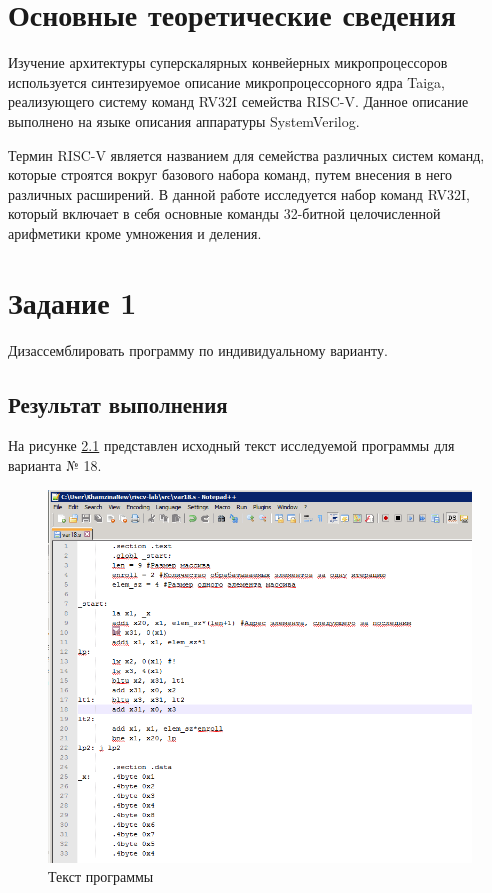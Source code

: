 \chapter{Основные теоретические сведения}

Изучение архитектуры суперскалярных конвейерных микропроцессоров используется синтезируемое описание микропроцессорного ядра Taiga, реализующего систему команд RV32I семейства RISC-V. Данное описание выполнено на языке описания аппаратуры SystemVerilog.

Термин RISC-V является названием для семейства различных систем команд, которые строятся вокруг базового набора команд, путем внесения в него различных расширений. В данной работе исследуется набор команд RV32I, который включает в себя основные команды 32-битной целочисленной арифметики кроме умножения и деления.

\chapter{Задание 1}

Дизассемблировать программу по индивидуальному варианту.

\section{Результат выполнения}

На рисунке \ref{img:code-asm} представлен исходный текст исследуемой программы для варианта № 18.

\begin{figure}[H]
	\begin{center}
		\includegraphics[scale=0.5]{img/code_asm.png}
	\end{center}
	\captionsetup{justification=centering}
	\caption{Текст программы}
	\label{img:code-asm}
\end{figure}

